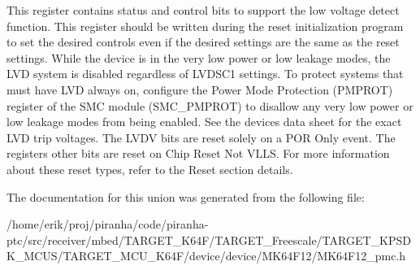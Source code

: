 This register contains status and control bits to support the low voltage detect function. This register should be written during the reset initialization program to set the desired controls even if the desired settings are the same as the reset settings. While the device is in the very low power or low leakage modes, the L\+VD system is disabled regardless of L\+V\+D\+S\+C1 settings. To protect systems that must have L\+VD always on, configure the Power Mode Protection (P\+M\+P\+R\+OT) register of the S\+MC module (S\+M\+C\+\_\+\+P\+M\+P\+R\+OT) to disallow any very low power or low leakage modes from being enabled. See the device\textquotesingle{}s data sheet for the exact L\+VD trip voltages. The L\+V\+DV bits are reset solely on a P\+OR Only event. The register\textquotesingle{}s other bits are reset on Chip Reset Not V\+L\+LS. For more information about these reset types, refer to the Reset section details. 

The documentation for this union was generated from the following file\+:\begin{DoxyCompactItemize}
\item 
/home/erik/proj/piranha/code/piranha-\/ptc/src/receiver/mbed/\+T\+A\+R\+G\+E\+T\+\_\+\+K64\+F/\+T\+A\+R\+G\+E\+T\+\_\+\+Freescale/\+T\+A\+R\+G\+E\+T\+\_\+\+K\+P\+S\+D\+K\+\_\+\+M\+C\+U\+S/\+T\+A\+R\+G\+E\+T\+\_\+\+M\+C\+U\+\_\+\+K64\+F/device/device/\+M\+K64\+F12/M\+K64\+F12\+\_\+pmc.\+h\end{DoxyCompactItemize}
